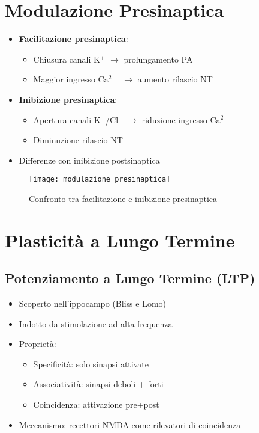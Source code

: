 \documentclass[12pt]{article}
\begin{document}
\section{Modulazione Presinaptica}
\begin{itemize}
    \item \textbf{Facilitazione presinaptica}: 
    \begin{itemize}
        \item Chiusura canali K$^+$ $\rightarrow$ prolungamento PA
        \item Maggior ingresso Ca$^{2+}$ $\rightarrow$ aumento rilascio NT
    \end{itemize}
    \item \textbf{Inibizione presinaptica}: 
    \begin{itemize}
        \item Apertura canali K$^+$/Cl$^-$ $\rightarrow$ riduzione ingresso Ca$^{2+}$
        \item Diminuzione rilascio NT
    \end{itemize}
    \item Differenze con inibizione postsinaptica
\end{itemize}

\begin{figure}[h]
    \centering
    \texttt{[image: modulazione\_presinaptica]}
    \caption{Confronto tra facilitazione e inibizione presinaptica}
\end{figure}

\section{Plasticità a Lungo Termine}
\subsection{Potenziamento a Lungo Termine (LTP)}
\begin{itemize}
    \item Scoperto nell'ippocampo (Bliss e Lomo)
    \item Indotto da stimolazione ad alta frequenza
    \item Proprietà:
    \begin{itemize}
        \item Specificità: solo sinapsi attivate
        \item Associatività: sinapsi deboli + forti
        \item Coincidenza: attivazione pre+post
    \end{itemize}
    \item Meccanismo: recettori NMDA come rilevatori di coincidenza
\end{itemize}
\end{document}
